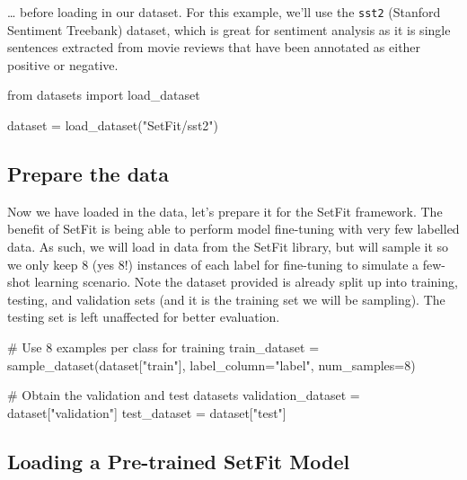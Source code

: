 \documentclass[
  letterpaper,
  DIV=11,
  numbers=noendperiod]{scrreprt}
\newenvironment{Shaded}{\begin{snugshade}}{\end{snugshade}}
\newcommand{\CommentTok}[1]{\textcolor[rgb]{0.37,0.37,0.37}{#1}}
\newcommand{\DecValTok}[1]{\textcolor[rgb]{0.68,0.00,0.00}{#1}}
\newcommand{\ImportTok}[1]{\textcolor[rgb]{0.00,0.46,0.62}{#1}}
\newcommand{\NormalTok}[1]{\textcolor[rgb]{0.00,0.23,0.31}{#1}}
\newcommand{\OperatorTok}[1]{\textcolor[rgb]{0.37,0.37,0.37}{#1}}
\newcommand{\StringTok}[1]{\textcolor[rgb]{0.13,0.47,0.30}{#1}}
\begin{document}
\ldots{} before loading in our dataset. For this example, we'll use the
\texttt{sst2} (Stanford Sentiment Treebank) dataset, which is great for
sentiment analysis as it is single sentences extracted from movie
reviews that have been annotated as either positive or negative.

\begin{Shaded}
\begin{Highlighting}[]
\ImportTok{from}\NormalTok{ datasets }\ImportTok{import}\NormalTok{ load\_dataset}

\NormalTok{dataset }\OperatorTok{=}\NormalTok{ load\_dataset(}\StringTok{"SetFit/sst2"}\NormalTok{)}
\end{Highlighting}
\end{Shaded}

\subsection{Prepare the data}\label{prepare-the-data-1}

Now we have loaded in the data, let's prepare it for the SetFit
framework. The benefit of SetFit is being able to perform model
fine-tuning with very few labelled data. As such, we will load in data
from the SetFit library, but will sample it so we only keep 8 (yes 8!)
instances of each label for fine-tuning to simulate a few-shot learning
scenario. Note the dataset provided is already split up into training,
testing, and validation sets (and it is the training set we will be
sampling). The testing set is left unaffected for better evaluation.

\begin{Shaded}
\begin{Highlighting}[]
\CommentTok{\# Use 8 examples per class for training}
\NormalTok{train\_dataset }\OperatorTok{=}\NormalTok{ sample\_dataset(dataset[}\StringTok{"train"}\NormalTok{], label\_column}\OperatorTok{=}\StringTok{"label"}\NormalTok{, num\_samples}\OperatorTok{=}\DecValTok{8}\NormalTok{)}

\CommentTok{\# Obtain the validation and test datasets}
\NormalTok{validation\_dataset }\OperatorTok{=}\NormalTok{ dataset[}\StringTok{"validation"}\NormalTok{]}
\NormalTok{test\_dataset }\OperatorTok{=}\NormalTok{ dataset[}\StringTok{"test"}\NormalTok{]}
\end{Highlighting}
\end{Shaded}

\subsection{Loading a Pre-trained SetFit
Model}\label{loading-a-pre-trained-setfit-model}
\end{document}
